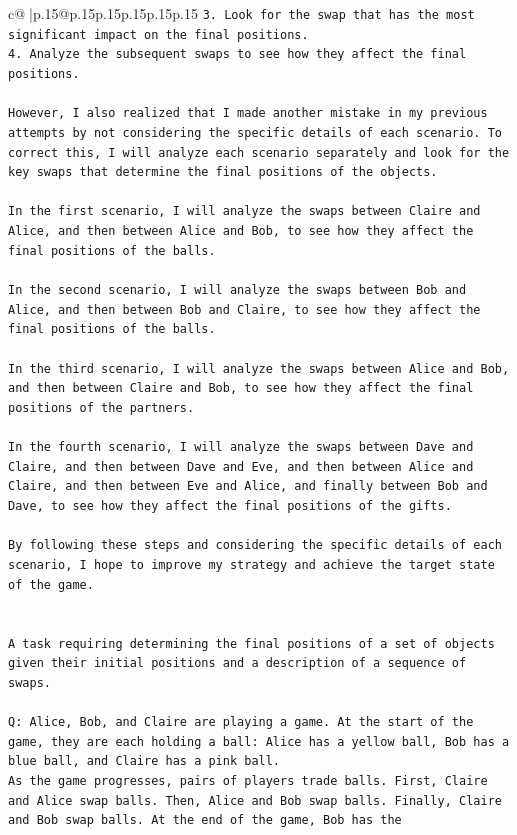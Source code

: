 \documentclass{article}
\begin{document}
{\begin{supertabular}{c@{$\;$}|p{.15\linewidth}@{}p{.15\linewidth}p{.15\linewidth}p{.15\linewidth}p{.15\linewidth}p{.15\linewidth}}
{{{\texttt{3. Look for the swap that has the most significant impact on the final positions.} \\
\texttt{4. Analyze the subsequent swaps to see how they affect the final positions.} \\
\\ 
\texttt{However, I also realized that I made another mistake in my previous attempts by not considering the specific details of each scenario. To correct this, I will analyze each scenario separately and look for the key swaps that determine the final positions of the objects.} \\
\\ 
\texttt{In the first scenario, I will analyze the swaps between Claire and Alice, and then between Alice and Bob, to see how they affect the final positions of the balls.} \\
\\ 
\texttt{In the second scenario, I will analyze the swaps between Bob and Alice, and then between Bob and Claire, to see how they affect the final positions of the balls.} \\
\\ 
\texttt{In the third scenario, I will analyze the swaps between Alice and Bob, and then between Claire and Bob, to see how they affect the final positions of the partners.} \\
\\ 
\texttt{In the fourth scenario, I will analyze the swaps between Dave and Claire, and then between Dave and Eve, and then between Alice and Claire, and then between Eve and Alice, and finally between Bob and Dave, to see how they affect the final positions of the gifts.} \\
\\ 
\texttt{By following these steps and considering the specific details of each scenario, I hope to improve my strategy and achieve the target state of the game.} \\
\\ 
\\ 
\texttt{A task requiring determining the final positions of a set of objects given their initial positions and a description of a sequence of swaps.} \\
\\ 
\texttt{Q: Alice, Bob, and Claire are playing a game. At the start of the game, they are each holding a ball: Alice has a yellow ball, Bob has a blue ball, and Claire has a pink ball.} \\
\texttt{As the game progresses, pairs of players trade balls. First, Claire and Alice swap balls. Then, Alice and Bob swap balls. Finally, Claire and Bob swap balls. At the end of the game, Bob has the} \\
}}}
\end{supertabular}}
\end{document}
